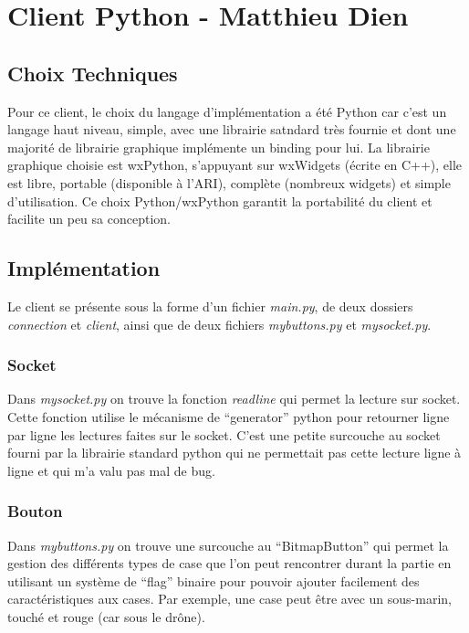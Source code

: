 \documentclass[a4paper, 11pt]{report}
\begin{document}
\chapter{Client Python - Matthieu Dien}

\section{Choix Techniques}

Pour ce client, le choix du langage d'implémentation a été Python car c'est un langage haut niveau, simple, 
avec une librairie satndard très fournie et dont une majorité de librairie graphique implémente
un binding pour lui. La librairie graphique choisie est wxPython, s'appuyant sur wxWidgets (écrite en C++), elle est libre, portable 
(disponible à l'ARI), complète (nombreux widgets) et simple d'utilisation.
Ce choix Python/wxPython garantit la portabilité du client et facilite un peu sa conception.

\section{Implémentation}

Le client se présente sous la forme d'un fichier \emph{main.py}, de deux dossiers 
\emph{connection} et \emph{client}, ainsi que de deux fichiers
\emph{mybuttons.py} et \emph{mysocket.py}.

\subsection{Socket}
Dans \emph{mysocket.py} on trouve la fonction \emph{readline} 
qui permet la lecture sur socket. Cette fonction utilise le mécanisme de ``generator'' python pour retourner ligne par ligne 
les lectures faites sur le socket. C'est une petite surcouche au socket fourni par la librairie standard python qui ne permettait pas cette 
lecture ligne à ligne et qui m'a valu pas mal de bug.

\subsection{Bouton}
Dans \emph{mybuttons.py} on trouve une surcouche au ``BitmapButton'' qui permet la gestion des différents types de 
case que l'on peut rencontrer durant la partie en utilisant un système de ``flag'' binaire pour pouvoir ajouter facilement des caractéristiques aux cases.
Par exemple, une case peut être avec un sous-marin, touché et rouge (car sous le drône).
\end{document}
